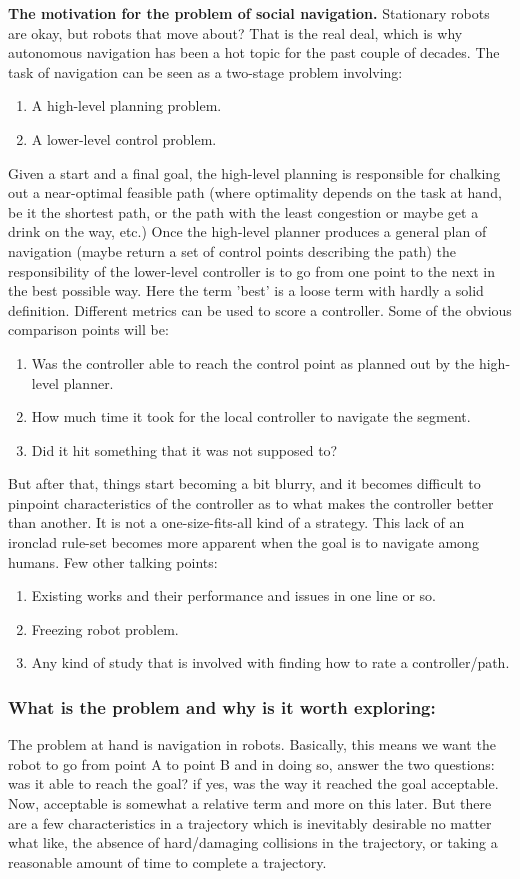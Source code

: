 \textbf{The motivation for the problem of social navigation.}
Stationary robots are okay, but robots that move about? That is the real deal, which is why autonomous navigation has been a hot topic for the past couple of decades. The task of navigation can be seen as a two-stage problem involving:
\begin{enumerate}
    \item A high-level planning problem.
    \item A lower-level control problem.
\end{enumerate}
Given a start and a final goal, the high-level planning is responsible for chalking out a near-optimal feasible path (where optimality depends on the task at hand, be it the shortest path, or the path with the least congestion or maybe get a drink on the way, etc.) Once the high-level planner produces a general plan of navigation (maybe return a set of control points describing the path) the responsibility of the lower-level controller is to go from one point to the next in the best possible way.
Here the term 'best' is a loose term with hardly a solid definition. Different metrics can be used to score a controller. Some of the obvious comparison points will be:
\begin{enumerate}
	\item Was the controller able to reach the control point as planned out by the high-level planner.
	\item How much time it took for the local controller to navigate the segment.
	\item Did it hit something that it was not supposed to?
\end{enumerate}
But after that, things start becoming a bit blurry, and it becomes difficult to pinpoint characteristics of the controller as to what makes the controller better than another. It is not a one-size-fits-all kind of a strategy. This lack of an ironclad rule-set becomes more apparent when the goal is to navigate among humans.
Few other talking points:
\begin{enumerate}
	\item Existing works and their performance and issues in one line or so.
	\item Freezing robot problem.
	\item Any kind of study that is involved with finding how to rate a controller/path. 
\end{enumerate}


\subsubsection*{What is the problem and why is it worth exploring:}
    The problem at hand is navigation in robots. Basically, this means we want the robot to go from point A to point B and in doing so, answer the two questions: was it able to reach the goal? if yes, was the way it reached the goal acceptable. Now, acceptable is somewhat a relative term and more on this later. But there are a few characteristics in a trajectory which is inevitably desirable no matter what like, the absence of hard/damaging collisions in the trajectory, or taking a reasonable amount of time to complete a trajectory. 
    

